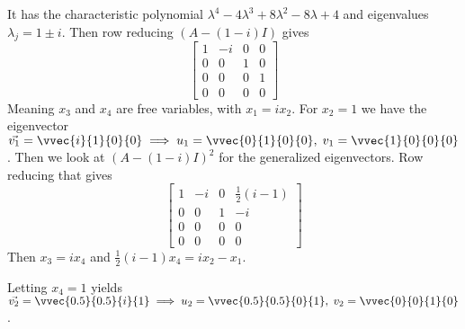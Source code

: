 It has the characteristic polynomial $\lambda^4 - 4\lambda^3 +8\lambda^2 - 8\lambda+4$ and eigenvalues $\lambda_j = 1 \pm i$. Then row reducing $(A-(1-i)I)$ gives
$$\begin{bmatrix}
    1&-i&0&0 \\ 0&0&1&0 \\ 0&0&0&1 \\ 0&0&0&0
\end{bmatrix}$$
Meaning $x_3$ and $x_4$ are free variables, with $x_1 = ix_2$. For $x_2 = 1$ we have the eigenvector $\vec{v_1} = \vvec{i}{1}{0}{0} \implies u_1 = \vvec{0}{1}{0}{0}, \; v_1 = \vvec{1}{0}{0}{0}$. Then we look at $(A-(1-i)I)^2$ for the generalized eigenvectors. Row reducing that gives
$$\begin{bmatrix}
    1&-i&0&\frac{1}{2}(i-1)\\
    0&0&1&-i\\
    0&0&0&0\\
    0&0&0&0
\end{bmatrix}$$
Then $x_3 = ix_4$ and $\frac{1}{2}(i-1)x_4 = ix_2 - x_1$.

\nl Letting $x_4 = 1$ yields $\vec{v_2} = \vvec{0.5}{0.5}{i}{1} \implies u_2 = \vvec{0.5}{0.5}{0}{1}, \; v_2 = \vvec{0}{0}{1}{0}$.